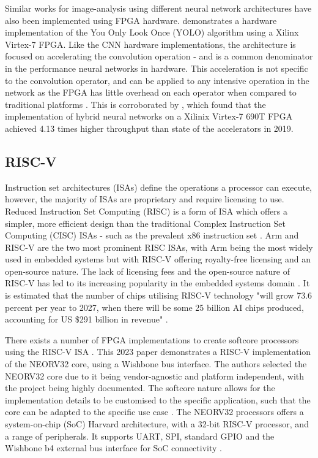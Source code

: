Similar works for image-analysis using different neural network architectures have also been implemented using FPGA hardware.
\cite{Yolo, SparseYolo} demonstrates a hardware implementation of the You Only Look Once (YOLO) algorithm using a Xilinx Virtex-7 FPGA. 
Like the CNN hardware implementations, the architecture is focused on accelerating the convolution operation - and is a common denominator in the performance neural networks in hardware.
This acceleration is not specific to the convolution operator, and can be applied to any intensive operation in the network as the FPGA has little overhead on each operator when compared to traditional platforms \cite{Overhead}.
This is corroborated by \cite{Throughput}, which found that the implementation of hybrid neural networks on a Xilinix Virtex-7 690T FPGA achieved 4.13 times higher throughput than state of the accelerators in 2019.


\subsection{RISC-V}
Instruction set architectures (ISAs) define the operations a processor can execute, however, the majority of ISAs are proprietary and require licensing to use.
Reduced Instruction Set Computing (RISC) is a form of ISA which offers a simpler, more efficient design than the traditional Complex Instruction Set Computing (CISC) ISAs - such as the prevalent x86 instruction set \cite{Arm}.
Arm and RISC-V are the two most prominent RISC ISAs, with Arm being the most widely used in embedded systems but with RISC-V offering royalty-free licensing and an open-source nature.
The lack of licensing fees and the open-source nature of RISC-V has led to its increasing popularity in the embedded systems domain \cite{Neutron}.
It is estimated that the number of chips utilising RISC-V technology "will grow 73.6 percent per year to 2027, when there will be some 25 billion AI chips produced, accounting for US \$291 billion in revenue" \cite{Drowsiness}.


There exists a number of FPGA implementations to create softcore processors using the RISC-V ISA \cite{RISCFPGA}. 
This 2023 paper \cite{Neutron} demonstrates a RISC-V implementation of the NEORV32 core, using a Wishbone bus interface. 
The authors selected the NEORV32 core due to it being vendor-agnostic and platform independent, with the project being highly documented.
The softcore nature allows for the implementation details to be customised to the specific application, such that the core can be adapted to the specific use case \cite{DCT}. 
The NEORV32 processors offers a system-on-chip (SoC) Harvard architecture, with a 32-bit RISC-V processor, and a range of peripherals.
It supports UART, SPI, standard GPIO and the Wishbone b4 external bus interface for SoC connectivity \cite{NEORV32}.


